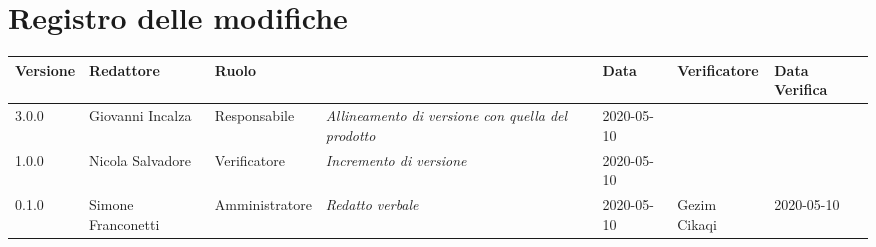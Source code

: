 \section*{Registro delle modifiche}
\renewcommand{\arraystretch}{1.8}

  \setlength\LTleft{-1.7cm}
  \begin{longtable}{|p{1.7cm}|p{2cm}|p{2.5cm}|p{3cm}|p{1.7cm}|p{2cm}|p{2.3cm}|}
    \hline

    \rowcolor{header}
    \textbf{Versione} & \textbf{Redattore} & \textbf{Ruolo} & \centering{\textbf{Descrizione}} & \textbf{Data} & \textbf{Verificatore} & \textbf{Data Verifica}\\

    \hline
    3.0.0 & Giovanni Incalza & Responsabile & \small{\textit{Allineamento di versione con quella del prodotto}} & 2020-05-10 & &\\
    1.0.0 & Nicola Salvadore & Verificatore & \small{\textit{Incremento di versione}} & 2020-05-10 & &\\
	0.1.0 & Simone Franconetti & Amministratore & \small{\textit{Redatto verbale}} & 2020-05-10 & Gezim Cikaqi & 2020-05-10 \\
    \hline
  \end{longtable}
  \setlength\LTleft{0cm}
